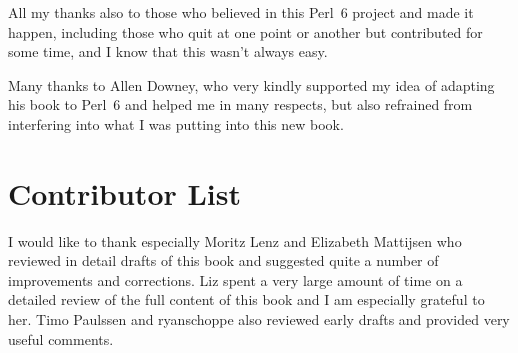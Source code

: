 All my thanks also to those who believed in 
this Perl~6 project and made it happen, including those who 
quit at one point or another but contributed for some 
time, and I know that this wasn't always easy.

Many thanks to Allen Downey, who very kindly supported my idea of 
adapting his book to Perl~6 and helped me in many respects, but 
also refrained from interfering into what I was putting into 
this new book.



\section*{Contributor List}

I would like to thank especially Moritz Lenz and Elizabeth 
Mattijsen who reviewed in detail drafts of this book 
and suggested quite a number of improvements and corrections. 
Liz spent a very large amount of time on a detailed 
review of the full content of this book and I am especially 
grateful to her. Timo Paulssen and 
ryanschoppe also reviewed early drafts and provided very 
useful comments.


\clearemptydoublepage

\begin{latexonly}

\tableofcontents

\clearemptydoublepage

\end{latexonly}

